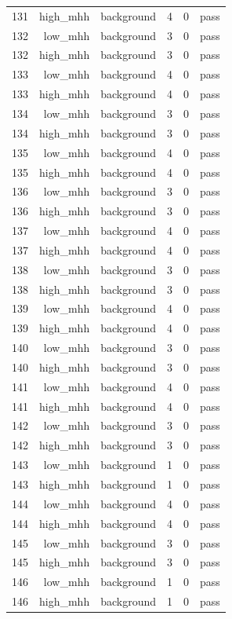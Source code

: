 \begin{table}[htbp]
{\begin{tabular}{lrrrrr}
131 & high\_mhh & background & 4 & 0 & pass \\
132 & low\_mhh & background & 3 & 0 & pass \\
132 & high\_mhh & background & 3 & 0 & pass \\
133 & low\_mhh & background & 4 & 0 & pass \\
133 & high\_mhh & background & 4 & 0 & pass \\
134 & low\_mhh & background & 3 & 0 & pass \\
134 & high\_mhh & background & 3 & 0 & pass \\
135 & low\_mhh & background & 4 & 0 & pass \\
135 & high\_mhh & background & 4 & 0 & pass \\
136 & low\_mhh & background & 3 & 0 & pass \\
136 & high\_mhh & background & 3 & 0 & pass \\
137 & low\_mhh & background & 4 & 0 & pass \\
137 & high\_mhh & background & 4 & 0 & pass \\
138 & low\_mhh & background & 3 & 0 & pass \\
138 & high\_mhh & background & 3 & 0 & pass \\
139 & low\_mhh & background & 4 & 0 & pass \\
139 & high\_mhh & background & 4 & 0 & pass \\
140 & low\_mhh & background & 3 & 0 & pass \\
140 & high\_mhh & background & 3 & 0 & pass \\
141 & low\_mhh & background & 4 & 0 & pass \\
141 & high\_mhh & background & 4 & 0 & pass \\
142 & low\_mhh & background & 3 & 0 & pass \\
142 & high\_mhh & background & 3 & 0 & pass \\
143 & low\_mhh & background & 1 & 0 & pass \\
143 & high\_mhh & background & 1 & 0 & pass \\
144 & low\_mhh & background & 4 & 0 & pass \\
144 & high\_mhh & background & 4 & 0 & pass \\
145 & low\_mhh & background & 3 & 0 & pass \\
145 & high\_mhh & background & 3 & 0 & pass \\
146 & low\_mhh & background & 1 & 0 & pass \\
146 & high\_mhh & background & 1 & 0 & pass \\

\end{tabular}}
\end{table}
